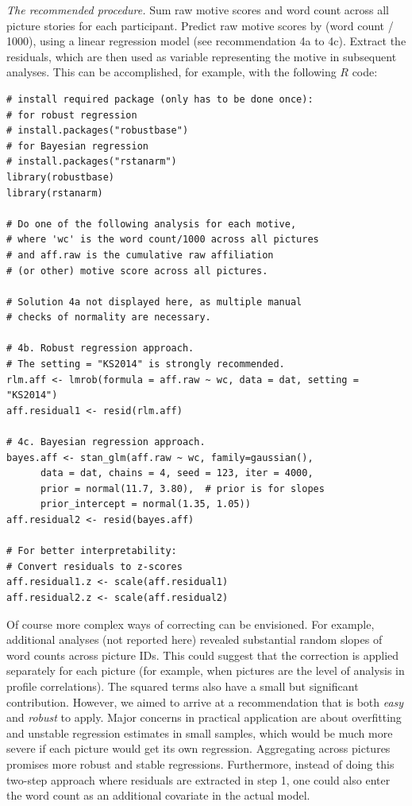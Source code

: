 \documentclass[man,a4paper,mask]{apa6}\usepackage[]{graphicx}\usepackage[]{color}
\begin{document}
\emph{The recommended procedure.} Sum raw motive scores and word count across all picture stories for each participant. Predict raw motive scores by (word count / 1000), using a linear regression model (see recommendation 4a to 4c). Extract the residuals, which are then used as variable representing the motive in subsequent analyses. This can be accomplished, for example, with the following $R$ code:

\begin{lstlisting}
# install required package (only has to be done once):
# for robust regression
# install.packages("robustbase")  
# for Bayesian regression
# install.packages("rstanarm")
library(robustbase)
library(rstanarm)

# Do one of the following analysis for each motive,
# where 'wc' is the word count/1000 across all pictures
# and aff.raw is the cumulative raw affiliation 
# (or other) motive score across all pictures.

# Solution 4a not displayed here, as multiple manual
# checks of normality are necessary.

# 4b. Robust regression approach. 
# The setting = "KS2014" is strongly recommended.
rlm.aff <- lmrob(formula = aff.raw ~ wc, data = dat, setting = "KS2014")
aff.residual1 <- resid(rlm.aff)

# 4c. Bayesian regression approach.
bayes.aff <- stan_glm(aff.raw ~ wc, family=gaussian(), 
      data = dat, chains = 4, seed = 123, iter = 4000,
      prior = normal(11.7, 3.80),  # prior is for slopes
      prior_intercept = normal(1.35, 1.05))
aff.residual2 <- resid(bayes.aff)

# For better interpretability: 
# Convert residuals to z-scores
aff.residual1.z <- scale(aff.residual1)
aff.residual2.z <- scale(aff.residual2)
\end{lstlisting}

Of course more complex ways of correcting can be envisioned. For example, additional analyses (not reported here) revealed substantial random slopes of word counts across picture IDs. This could suggest that the correction is applied separately for each picture (for example, when pictures are the level of analysis in profile correlations). The squared terms also have a small but significant contribution. However, we aimed to arrive at a recommendation that is both \emph{easy} and \emph{robust} to apply. Major concerns in practical application are about overfitting and unstable regression estimates in small samples, which would be much more severe if each picture would get its own regression. Aggregating across pictures promises more robust and stable regressions. Furthermore, instead of doing this two-step approach where residuals are extracted in step 1, one could also enter the word count as an additional covariate in the actual model.
\end{document}
